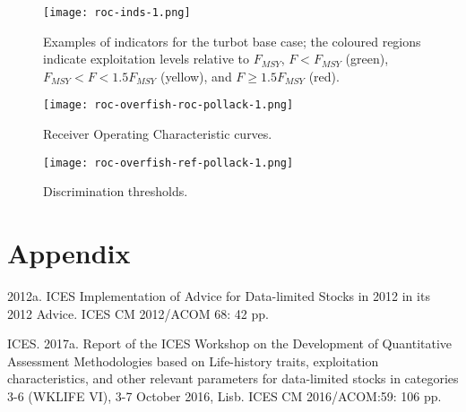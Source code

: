 \documentclass[12pt,doublespacing,a4paper]{ouparticle}
\begin{document}
\newpage
\begin{figure}[h]
\centering
\texttt{[image: roc-inds-1.png]}
\caption{Examples of indicators for the turbot base case; the coloured regions indicate exploitation levels relative to $F_{MSY}$, $F<F_{MSY}$ (green),  $F_{MSY} <F< 1.5F_{MSY}$ (yellow), and $F \geq 1.5F_{MSY}$ (red).}
\label{fig:indicators}
\end{figure}


\newpage
\begin{figure}[h]
\centering
\texttt{[image: roc-overfish-roc-pollack-1.png]}
\caption{Receiver Operating Characteristic curves.}
\label{fig:roc}
\end{figure}


\newpage
\begin{figure}[h]
\centering
\texttt{[image: roc-overfish-ref-pollack-1.png]}
\caption{Discrimination thresholds.}
\label{fig:discrim}
\end{figure}

\clearpage
\section{Appendix}


2012a. ICES Implementation of Advice for Data-limited Stocks in 2012 in its 2012 Advice. ICES CM 2012/ACOM 68: 42 pp.

ICES. 2017a. Report of the ICES Workshop on the Development of Quantitative Assessment Methodologies based on Life-history traits, exploitation characteristics, and other relevant parameters for data-limited stocks in categories 3-6 (WKLIFE VI), 3-7 October 2016, Lisb. ICES CM 2016/ACOM:59: 106 pp.
\end{document}
